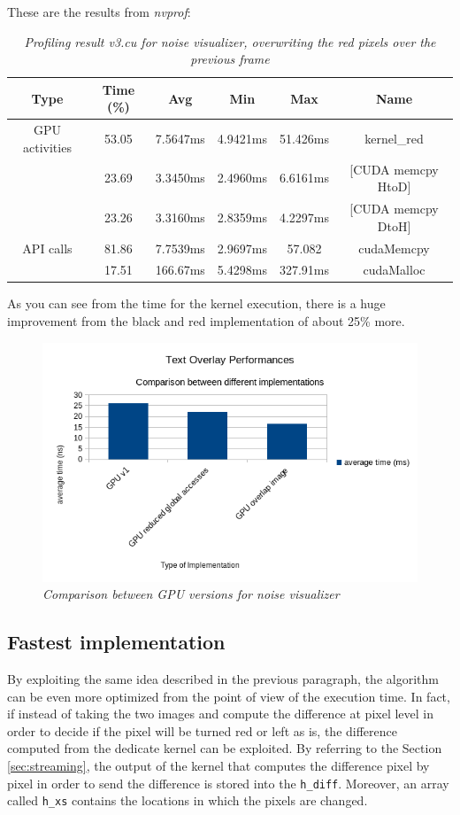 \documentclass[paper=a4, fontsize=10pt]{scrartcl}	%
\begin{document}
	These are the results from \textit{nvprof}:
	\begin{table}[H]
		\centering
		\begin{center}
			\begin{tabular}{ |c|c|c|c|c|c| } 
				\hline
				\textbf{Type} & \textbf{Time} (\%) & \textbf{Avg} & \textbf{Min} & \textbf{Max} & \textbf{Name} \\ 
				\hline
				GPU activities & 53.05 & 7.5647ms &  4.9421ms &  51.426ms & kernel\_red \\ 
				& 23.69 & 3.3450ms & 2.4960ms & 6.6161ms & [CUDA memcpy HtoD] \\ 
				& 23.26 & 3.3160ms & 2.8359ms & 4.2297ms & [CUDA memcpy DtoH] \\ 
				\hline
				API calls & 81.86 &  7.7539ms &  2.9697ms &  57.082 & cudaMemcpy \\ 
				& 17.51 & 166.67ms & 5.4298ms & 327.91ms & cudaMalloc \\ 
				\hline
			\end{tabular}
		\end{center}
		\label{fig:table_v3_red}
		\caption{\textit{Profiling result v3.cu for noise visualizer, overwriting the red pixels over the previous frame}}
	\end{table}
	
	As you can see from the time for the kernel execution, there is a huge improvement from the black and red implementation of about 25\% more.
	
	\begin{figure}[H]
		\centering
		\includegraphics[width=0.6\linewidth]{images/heatmap/noise2}
		\caption{\textit{Comparison between GPU versions for noise visualizer}}
		\label{fig:noise2}
	\end{figure}

	\subsection{Fastest implementation}
	By exploiting the same idea described in the previous paragraph, the algorithm can be even more optimized from the point of view of the execution time. In fact, if instead of taking the two images and compute the difference at pixel level in order to decide if the pixel will be turned red or left as is, the difference computed from the dedicate kernel can be exploited.\newline\newline
	By referring to the Section \ref{sec:streaming}, the output of the kernel that computes the difference pixel by pixel in order to send the difference is stored into the \texttt{h\_diff}. Moreover, an array called \texttt{h\_xs} contains the locations in which the pixels are changed.
	
\end{document}
